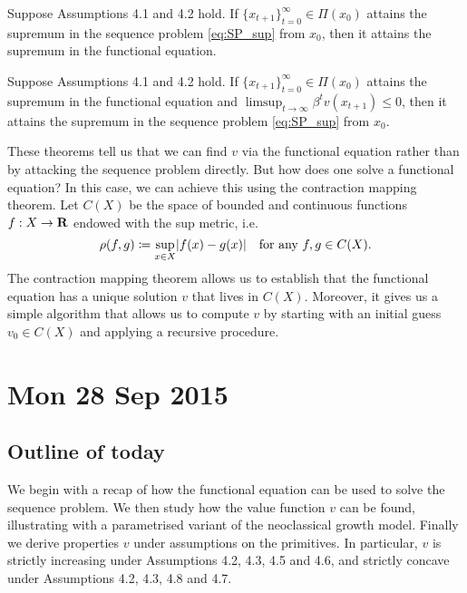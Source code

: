 \documentclass[11pt,letterpaper,reqno,oneside]{article}
\begin{document}
\begin{theorem}[SLP Th'm 4.4]
	Suppose Assumptions 4.1 and 4.2 hold. If $\{ x_{t+1} \}_{t=0}^\infty \in \Pi(x_0)$ attains the supremum in the sequence problem \eqref{eq:SP_sup} from $x_0$, then it attains the supremum in the functional equation.
\end{theorem}
%
\begin{theorem}[SLP Th'm 4.5]
	Suppose Assumptions 4.1 and 4.2 hold. If $\{ x_{t+1} \}_{t=0}^\infty \in \Pi(x_0)$ attains the supremum in the functional equation and $\limsup_{t\to\infty} \beta^t v(x_{t+1}) \leq 0$, then it attains the supremum in the sequence problem \eqref{eq:SP_sup} from $x_0$.
\end{theorem}


These theorems tell us that we can find $v$ via the functional equation rather than by attacking the sequence problem directly. But how does one solve a functional equation? In this case, we can achieve this using the contraction mapping theorem. Let $C(X)$ be the space of bounded and continuous functions $f : X \to \mathbf{R}$ endowed with the sup metric, i.e.
%
\begin{equation*}
	\rho(f,g) \coloneqq \sup_{x \in X} \lvert f(x) - g(x) \rvert
	\quad\text{for any $f,g \in C(X)$} .
\end{equation*}
%
The contraction mapping theorem allows us to establish that the functional equation has a unique solution $v$ that lives in $C(X)$. Moreover, it gives us a simple algorithm that allows us to compute $v$ by starting with an initial guess $v_0 \in C(X)$ and applying a recursive procedure.



\pagebreak
\section{Mon 28 Sep 2015}
\label{sec:28Sep2015}


\subsection{Outline of today}
\label{sec:28Sep2015:outline_of_today}

We begin with a recap of how the functional equation can be used to solve the sequence problem. We then study how the value function $v$ can be found, illustrating with a parametrised variant of the neoclassical growth model. Finally we derive properties $v$ under assumptions on the primitives. In particular, $v$ is strictly increasing under Assumptions 4.2, 4.3, 4.5 and 4.6, and strictly concave under Assumptions 4.2, 4.3, 4.8 and 4.7.
\end{document}
